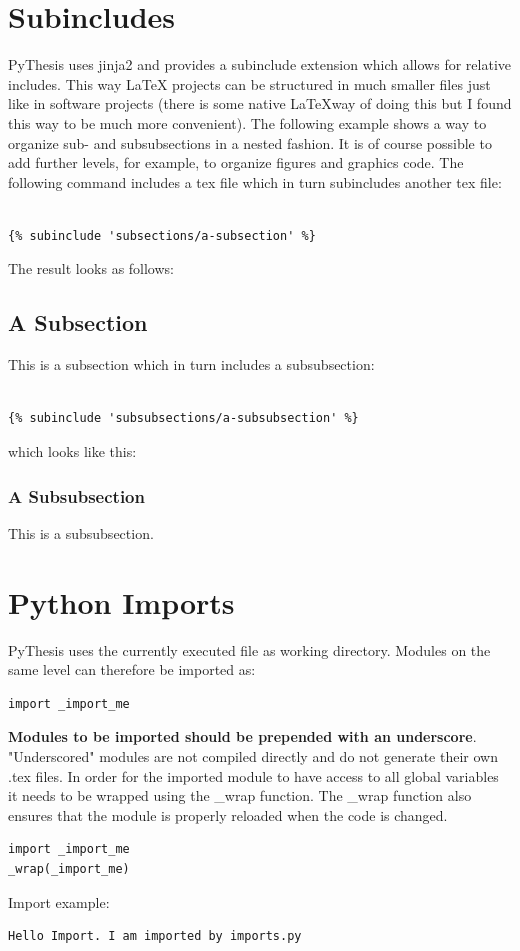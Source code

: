 \documentclass[a4paper]{book}
\begin{document}
\section{Subincludes}
\label{sec:subincludes}
PyThesis uses jinja2 and provides a subinclude extension which allows for relative includes. This way LaTeX projects can be structured in much smaller files just like in software projects (there is some native \LaTeX way of doing this but I found this way to be much more convenient). The following example shows a way to organize sub- and subsubsections in a nested fashion. It is of course possible to add further levels, for example, to organize figures and graphics code. The following command includes a tex file which in turn subincludes another tex file:
\begin{verbatim}

{% subinclude 'subsections/a-subsection' %}

\end{verbatim}
The result looks as follows:
\subsection{A Subsection}
\label{sec:a-subsection}
This is a subsection which in turn includes a subsubsection:
\begin{verbatim}

{% subinclude 'subsubsections/a-subsubsection' %}

\end{verbatim}
which looks like this:
\subsubsection{A Subsubsection}
\label{sec:a-subsubsection}
This is a subsubsection.
\section{Python Imports}
\label{sec:python-imports}
PyThesis uses the currently executed file as working directory. Modules on the same level can therefore be imported as:
\begin{verbatim}
import _import_me
\end{verbatim}
\textbf{Modules to be imported should be prepended with an underscore}. "Underscored" modules are not compiled directly and do not generate their own .tex files. In order for the imported module to have access to all global variables it needs to be wrapped using the \_wrap function. The \_wrap function also ensures that the module is properly reloaded when the code is changed.
\begin{verbatim}
import _import_me
_wrap(_import_me)
\end{verbatim}
Import example:
\begin{verbatim}
Hello Import. I am imported by imports.py
\end{verbatim}
\end{document}

